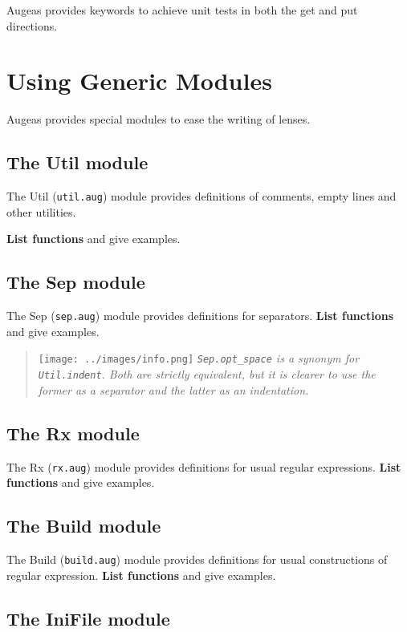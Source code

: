 Augeas provides keywords to achieve unit tests in both the get and put directions.

\section{Using Generic Modules}

Augeas provides special modules to ease the writing of lenses.

\subsection{The Util module}

The Util (\verb!util.aug!) module provides definitions of comments, empty lines and other utilities.

\textbf{List functions} and give examples.

\subsection{The Sep module}

The Sep (\verb!sep.aug!) module provides definitions for separators. \textbf{List functions} and give examples.

\begin{quote}
\texttt{[image: ../images/info.png]} \emph{\texttt{Sep.opt\_space} is a synonym for \texttt{Util.indent}. Both are strictly equivalent, but it is clearer to use the former as a separator and the latter as an indentation.}

\end{quote}
\subsection{The Rx module}

The Rx (\verb!rx.aug!) module provides definitions for usual regular expressions. \textbf{List functions} and give examples.

\subsection{The Build module}

The Build (\verb!build.aug!) module provides definitions for usual constructions of regular expression. \textbf{List functions} and give examples.

\subsection{The IniFile module}


